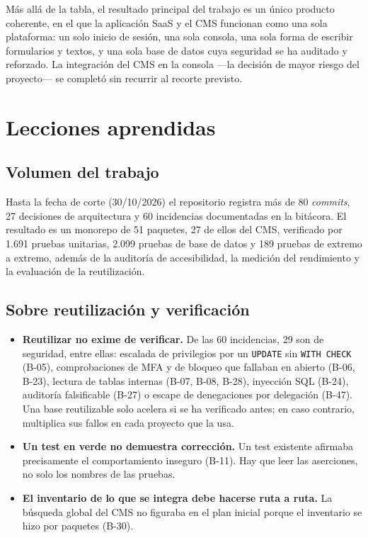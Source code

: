 Más allá de la tabla, el resultado principal del trabajo es un único producto
coherente, en el que la aplicación SaaS y el CMS funcionan como una sola
plataforma: un solo inicio de sesión, una sola
consola, una sola forma de escribir formularios y textos, y una sola base de
datos cuya seguridad se ha auditado y reforzado. La integración del CMS en la
consola ---la decisión de mayor riesgo del proyecto--- se completó sin
recurrir al recorte previsto.

\section{Lecciones aprendidas}
\label{sec:concl-lecciones}

\subsection{Volumen del trabajo}

Hasta la fecha de corte (30/10/2026) el repositorio registra más de 80
\textit{commits}, 27 decisiones de arquitectura y 60 incidencias documentadas
en la bitácora. El resultado es un monorepo de 51 paquetes, 27 de ellos del
CMS, verificado por 1.691 pruebas unitarias, 2.099 pruebas de base de datos
y 189 pruebas de extremo a extremo, además de la auditoría de accesibilidad,
la medición del rendimiento y la evaluación de la reutilización.

\subsection{Sobre reutilización y verificación}

\begin{itemize}
  \item \textbf{Reutilizar no exime de verificar.} De las 60 incidencias, 29
        son de seguridad, entre ellas: escalada
        de privilegios por un \texttt{UPDATE} sin \texttt{WITH CHECK} (B-05),
        comprobaciones de MFA y de bloqueo que fallaban en abierto (B-06,
        B-23), lectura de tablas internas (B-07, B-08, B-28), inyección SQL
        (B-24), auditoría falsificable (B-27) o escape de denegaciones por
        delegación (B-47). Una base reutilizable solo acelera si se ha
        verificado antes; en caso contrario, multiplica sus fallos en cada
        proyecto que la usa.
  \item \textbf{Un test en verde no demuestra corrección.} Un test existente
        afirmaba precisamente el comportamiento inseguro (B-11). Hay que leer
        las aserciones, no solo los nombres de las pruebas.
  \item \textbf{El inventario de lo que se integra debe hacerse ruta a ruta.} La
        búsqueda global del CMS no figuraba en el plan inicial porque el
        inventario se hizo por paquetes (B-30).
\end{itemize}

